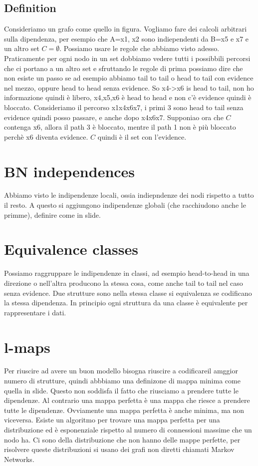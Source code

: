\subsection{Definition}
Consideriamo un grafo come quello in figura. Vogliamo fare dei calcoli arbitrari sulla dipendenza, per esempio che A=x1, x2 sono indiependenti da B=x5 e x7 e un altro set $C=\emptyset$. Possiamo usare le regole che abbiamo visto adesso. Praticamente per ogni nodo in un set dobbiamo vedere tutti i possibbili percorsi che ci portano a un altro set e sfruttando le regole di prima possiamo dire che non esiste un passo se ad esempio abbiamo tail to tail o head to tail con evidence nel mezzo, oppure head to head senza evidence. So x4->x6 is head to tail, non ho informazione quindi è libero, x4,x5,x6 è head to head e non c'è evidence quindi è bloccato. Consideriamo il percorso x1x4x6x7, i primi 3 sono head to tail senza evidence quindi posso passare, e anche dopo x4x6x7. \newline
Supponiao ora che $C$ contenga x6, allora il path 3 è bloccato, mentre il path 1 non è più bloccato perchè x6 diventa evidence.\newline
$C$ quindi è il set con l'evidence. 
\section{BN independences}
Abbiamo visto le indipendenze locali, ossia indiepndenze dei nodi rispetto a tutto il resto. A questo si aggiungono indipendenze globali (che racchiudono anche le primme), definire come in slide. \newline
\section{Equivalence classes}
Possiamo raggruppare le indipendenze in classi, ad esempio head-to-head in una direzione o nell'altra producono la stessa cosa, come anche tail to tail nel caso senza evidence. Due strutture sono nella stessa classe si equivalenza se codificano la stessa dipendenza. In principio ogni struttura da una classe è equivalente per rappresentare i dati. \newline
\section{l-maps}
Per riuscire ad avere un buon modello bisogna riuscire a codificareil amggior numero di strutture, quindi abbbiamo una definizone di mappa minima come quella in slide. Questo non soddisfa il fatto che riusciamo a prendere tutte le dipendenze. \newline
Al contrario una mappa perfetta è una mappa che riesce a prendere tutte le dipendenze. Ovviamente una mappa perfetta è anche minima, ma non viceversa. Esiste un algoritmo per trovare una mappa perfetta per una distribuzione ed è esponenziale rispetto al numero di connessioni massime che un nodo ha. Ci sono della distribuzione che non hanno delle mappe perfette, per risolvere queste distribuzioni si usano dei grafi non diretti chiamati Markov Networks. \newline
